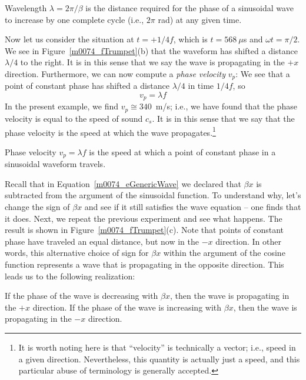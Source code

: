 \begin{mdframed}[backgroundcolor=yellow!20,nobreak=true]
Wavelength 
$\lambda=2\pi/\beta$ is the distance required for the phase of a sinusoidal wave to increase by one complete cycle (i.e., $2\pi$ rad) at any given time. 
\end{mdframed}

Now let us consider the situation at $t=+1/4f$, which is $t=568~\mu$s and $\omega t=\pi/2$.
We see in Figure~\ref{m0074_fTrumpet}(b) that the waveform has shifted a distance $\lambda/4$ to the right.
It is in this sense that we say the wave is propagating in the $+x$ direction.
Furthermore, we can now compute a \emph{phase velocity} $v_p$: 
We see that a point of constant phase has shifted a distance $\lambda/4$ in time $1/4f$, so   
%
\begin{equation}
v_p = \lambda f 
\end{equation}
%
In the present example, we find $v_p\cong 340$~m/s; i.e., we have found that the phase velocity is equal to the speed of sound $c_s$.  
It is in this sense that we say that the phase velocity is the speed at which the wave propagates.\footnote{It is worth noting here is that ``velocity'' is technically a vector; i.e., speed in a given direction. Nevertheless, this quantity is actually just a speed, and this particular abuse of terminology is generally accepted.}

\begin{mdframed}[backgroundcolor=yellow!20,nobreak=true]
Phase velocity 
$v_p=\lambda f$ is the speed at which a point of constant phase in a sinusoidal waveform travels.  
\end{mdframed}

Recall that in Equation~\ref{m0074_eGenericWave} we declared that $\beta x$ is subtracted from the argument of the sinusoidal function.  
To understand why, let's change the sign of $\beta x$ and see if it still satisfies the wave equation -- one finds that it does.
Next, we repeat the previous experiment and see what happens.
The result is shown in Figure~\ref{m0074_fTrumpet}(c).
Note that points of constant phase have traveled an equal distance, but now in the $-x$ direction.  
In other words, this alternative choice of sign for $\beta x$ within the argument of the cosine function represents a wave that is propagating in the opposite direction.  
This leads us to the following realization:

\begin{mdframed}[backgroundcolor=yellow!20,nobreak=true]
If the phase of the wave is decreasing with $\beta x$, then the wave is propagating in the $+x$ direction.
If the phase of the wave is increasing with $\beta x$, then the wave is propagating in the $-x$ direction.
\end{mdframed}

